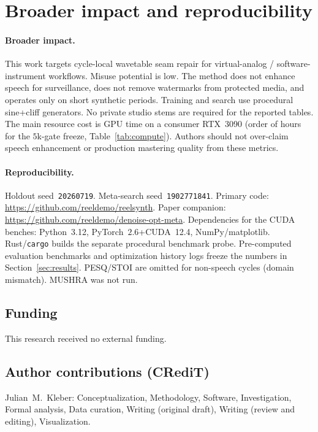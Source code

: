 \section{Broader impact and reproducibility}
\label{sec:ethics}

\paragraph{Broader impact.}
This work targets cycle-local wavetable seam repair for virtual-analog / software-instrument workflows.
Misuse potential is low. The method does not enhance speech for surveillance, does not remove watermarks from protected media, and operates only on short synthetic periods.
Training and search use procedural sine{+}cliff generators. No private studio stems are required for the reported tables.
The main resource cost is GPU time on a consumer RTX~3090 (order of hours for the $5$k-gate freeze, Table~\ref{tab:compute}).
Authors should not over-claim speech enhancement or production mastering quality from these metrics.

\paragraph{Reproducibility.}
Holdout seed~\texttt{20260719}. Meta-search seed~\texttt{1902771841}.
Primary code: \url{https://github.com/reeldemo/reelsynth}.
Paper companion: \url{https://github.com/reeldemo/denoise-opt-meta}.
Dependencies for the CUDA benches: Python~3.12, PyTorch~$2.6$+CUDA~12.4, NumPy/matplotlib. Rust/\texttt{cargo} builds the separate procedural benchmark probe.
Pre-computed evaluation benchmarks and optimization history logs freeze the numbers in Section~\ref{sec:results}.
PESQ/STOI are omitted for non-speech cycles (domain mismatch). MUSHRA was not run.

\subsection{Funding}
\label{sec:funding}
This research received no external funding.

\subsection{Author contributions (CRediT)}
\label{sec:credit}
Julian~M.~Kleber: Conceptualization, Methodology, Software, Investigation, Formal analysis, Data curation, Writing (original draft), Writing (review and editing), Visualization.

